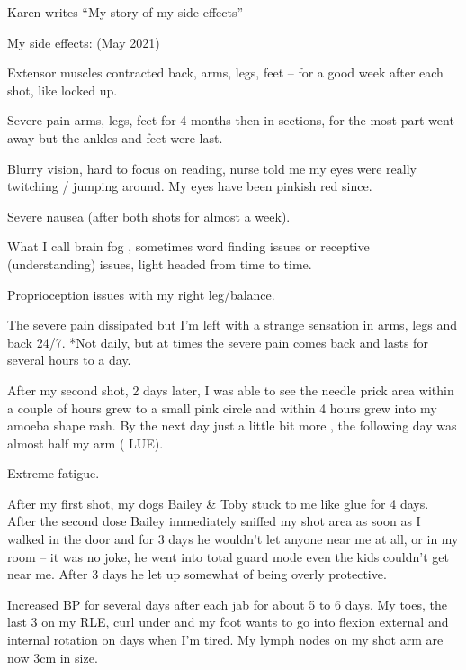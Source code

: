 Karen writes “My story of my side effects”

My side effects: (May 2021)

Extensor muscles contracted back, arms, legs, feet – for a good week after each
shot, like locked up.

Severe pain arms, legs, feet for 4 months then in sections, for the most part
went away but the ankles and feet were last.

Blurry vision, hard to focus on reading, nurse told me my eyes were really
twitching / jumping around. My eyes have been pinkish red since.

Severe nausea (after both shots for almost a week).

What I call brain fog , sometimes word finding issues or receptive
(understanding) issues, light headed from time to time.

Proprioception issues with my right leg/balance.

The severe pain dissipated but I’m left with a strange sensation in arms, legs
and back 24/7. *Not daily, but at times the severe pain comes back and lasts for
several hours to a day.

After my second shot, 2 days later, I was able to see the needle prick area
within a couple of hours grew to a small pink circle and within 4 hours grew
into my amoeba shape rash. By the next day just a little bit more , the
following day was almost half my arm ( LUE).

Extreme fatigue.

After my first shot, my dogs Bailey \& Toby stuck to me like glue for 4
days. After the second dose Bailey immediately sniffed my shot area as soon as I
walked in the door and for 3 days he wouldn’t let anyone near me at all, or in
my room – it was no joke, he went into total guard mode even the kids couldn’t
get near me. After 3 days he let up somewhat of being overly protective.

Increased BP for several days after each jab for about 5 to 6 days. My toes, the
last 3 on my RLE, curl under and my foot wants to go into flexion external and
internal rotation on days when I’m tired. My lymph nodes on my shot arm are now
3cm in size.

